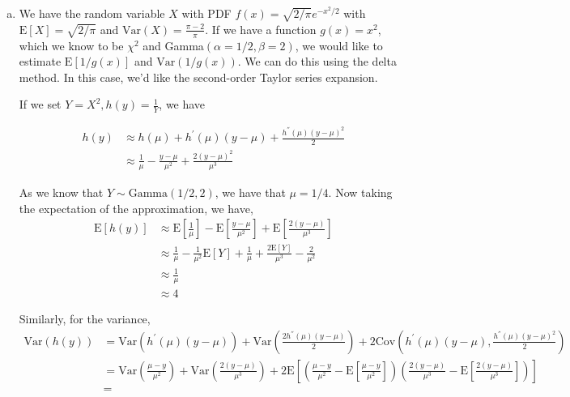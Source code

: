 \documentclass[11pt]{article}
\begin{document}
\begin{enumerate}[(a)]
  \item We have the random variable $X$ with PDF $f(x) = \sqrt{2/\pi}
    e^{-x^2/2}$ with $\mathrm{E}[X] = \sqrt{2/\pi}$ and
    $\mathrm{Var}(X) = \frac{\pi-2}{\pi}$.  If we have a function
    $g(x) = x^2$, which we know to be $\chi^2$ and
    Gamma$(\alpha=1/2,\beta=2)$, we would like to estimate
    $\mathrm{E}[1/g(x)]$ and $\mathrm{Var}(1/g(x))$.  We can do this
    using the delta method.  In this case, we'd like the second-order
    Taylor series expansion.

    If we set $Y = X^2, h(y) = \frac{1}{Y}$, we have

    \begin{align*}
      h(y) &\approx h(\mu) + h^{'}(\mu)(y-\mu) +
      \frac{h^{''}(\mu)(y-\mu)^2}{2} \\
      &\approx \frac{1}{\mu} - \frac{y-\mu}{\mu^2} +
      \frac{2(y-\mu)^2}{\mu^3}
    \end{align*}

    As we know that $Y \sim \mathrm{Gamma}(1/2, 2)$, we have that $\mu
    = 1/4$.  Now taking the expectation of the approximation, we have,
    \begin{align*}
      \mathrm{E}[h(y)] &\approx \mathrm{E}\left[ \frac{1}{\mu}
      \right]- \mathrm{E} \left[ \frac{y-\mu}{\mu^2} \right] +
      \mathrm{E} \left[ \frac{2(y-\mu)}{\mu^3} \right] \\
      &\approx \frac{1}{\mu} - \frac{1}{\mu^2}\mathrm{E}[Y] +
      \frac{1}{\mu} + \frac{2 \mathrm{E}[Y]}{\mu^3} - \frac{2}{\mu^2}
      \\
      &\approx \frac{1}{\mu} \\
      &\approx 4
    \end{align*}

    Similarly, for the variance,
    \begin{align*}
      \mathrm{Var}(h(y)) &= \mathrm{Var}(h^{'}(\mu)(y-\mu)) +
      \mathrm{Var}\left( \frac{2 h^{''}(\mu)(y-\mu)}{2} \right) + 2
      \mathrm{Cov}\left( h^{'}(\mu)(y-\mu), \frac{h^{''}(\mu)
          (y-\mu)^2}{2} \right) \\
      &= \mathrm{Var}\left( \frac{\mu-y}{\mu^2} \right) + \mathrm{Var}
      \left( \frac{2(y-\mu)}{\mu^3} \right) + 2 \mathrm{E} \left[
        \left( \frac{\mu-y}{\mu^2} - \mathrm{E}\left[
            \frac{\mu-y}{\mu^2} \right] \right) \left(
          \frac{2(y-\mu)}{\mu^3} -
          \mathrm{E}\left[\frac{2(y-\mu)}{\mu^3}\right]\right) \right]
      \\
      &= 
    \end{align*}

\end{enumerate}
\end{document}
